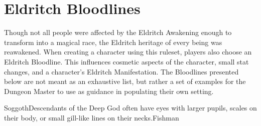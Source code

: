 \documentclass[././main.tex]{subfiles}
\begin{document}
\section{Eldritch Bloodlines}
Though not all people were affected by the Eldritch Awakening enough to transform into a magical race, the Eldritch heritage of every being was reawakened. When creating a character using this ruleset, players also choose an Eldritch Bloodline. This influences cosmetic aspects of the character, small stat changes, and a character's Eldritch Manifestation. The Bloodlines presented below are not meant as an exhaustive list, but rather a set of examples for the Dungeon Master to use as guidance in populating their own setting.

\begin{dndbloodline}{Soggoth}{Descendants of the Deep God often have eyes with larger pupils, scales on their body, or small gill-like lines on their necks.}{Fishman}

\end{dndbloodline}
\end{document}
